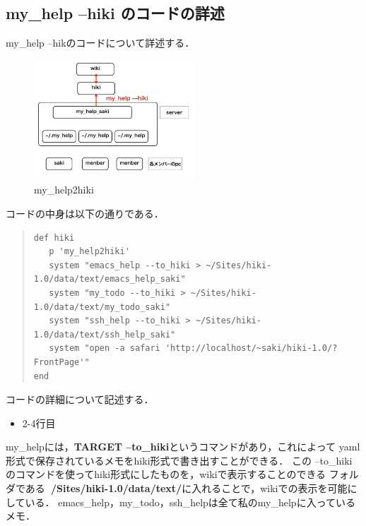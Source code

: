 \newpage

\subsection{my\_help --hiki のコードの詳述}
my\_help --hikのコードについて詳述する．

\begin{figure}[htbp]\begin{center}
\includegraphics[width=6cm,bb=100 100 600 800]{my_help2hiki_saki.013.png}
\caption{my\_help2hiki}
\label{default}\end{center}\end{figure}

コードの中身は以下の通りである．
\begin{quote}\begin{verbatim}
def hiki
   p 'my_help2hiki'
   system "emacs_help --to_hiki > ~/Sites/hiki-1.0/data/text/emacs_help_saki"
   system "my_todo --to_hiki > ~/Sites/hiki-1.0/data/text/my_todo_saki"
   system "ssh_help --to_hiki > ~/Sites/hiki-1.0/data/text/ssh_help_saki"
   system "open -a safari 'http://localhost/~saki/hiki-1.0/?FrontPage'"
end
\end{verbatim}\end{quote}
\newpage
コードの詳細について記述する．
\begin{itemize}
\item 2-4行目
\end{itemize}
\begin{description}
\item my\_helpには，\textbf{TARGET --to\_hiki}というコマンドがあり，これによって
yaml形式で保存されているメモをhiki形式で書き出すことができる．
この --to\_hiki のコマンドを使ってhiki形式にしたものを，wikiで表示することのできる
フォルダである\textbf{~/Sites/hiki-1.0/data/text/}に入れることで，wikiでの表示を可能にしている．
emacs\_help，my\_todo，ssh\_helpは全て私のmy\_helpに入っているメモ．
\end{description}

